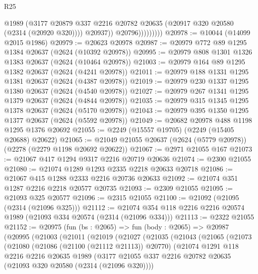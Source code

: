 \begin{lexlean}{R25}
\begin{coremodule}
                          @1989
                          (@3177
                            @20879
                            @337
                            @2216
                            @20782
                            @20635
                            (@20917 @320 @20580 (@2314 (@20920 @320))))
                          @20937))
                      @20796)))))))))
@20978 := @10044 (@14099 @2015 @1986)
@20979 := @20623 @20978
@20987 := @20979 @772 @89 @1295 @1384 @20637 (@2624 (@10392 @20978))
@20995 := @20979 @808 @1301 @1326 @1383 @20637 (@2624 (@10464 @20978))
@21003 := @20979 @164 @89 @1295 @1382 @20637 (@2624 (@4241 @20978))
@21011 := @20979 @188 @1331 @1295 @1381 @20637 (@2624 (@4387 @20978))
@21019 := @20979 @230 @1337 @1295 @1380 @20637 (@2624 (@4540 @20978))
@21027 := @20979 @267 @1341 @1295 @1379 @20637 (@2624 (@4844 @20978))
@21035 := @20979 @315 @1345 @1295 @1378 @20637 (@2624 (@5170 @20978))
@21043 := @20979 @395 @1350 @1295 @1377 @20637 (@2624 (@5592 @20978))
@21049 := @20682 @20978 @488 @1198 @1295 @1376 @20692
@21055 := @2249 (@15557 @19705) (@2249 (@15405 @20688) @20622)
@21065 := @21049 @21055 @20637 (@2624 (@5779 @20978)) (@2278 (@2279 @1198 @20692 @20622))
@21067 := @2971 @21055 @167
@21073 := @21067 @417 @1294 @9317 @2216 @20719 @20636
@21074 := @2300 @21055
@21080 := @21074 @1289 @1293 @2335 @2218 @20633 @20718
@21086 := @21067 @415 @1288 @2333 @2216 @20736 @20633
@21092 := @21074 @351 @1287 @2216 @2218 @20577 @20735
@21093 := @2309 @21055
@21095 := @21093 @325 @20577
@21096 := @2315 @21055
@21100 := @21092 (@21095 (@2314 (@21096 @325)))
@21112 := @21074 @354 @118 @2216 @2216 @20574 @1989 (@21093 @334 @20574 (@2314 (@21096 @334)))
@21113 := @2322 @21055
@21152 := @20975
    (fun (bs : @2065) =>
    fun (body : @2065) =>
    @20987
      (@20995
        (@21003
          (@21011
            (@21019
              (@21027
                (@21035
                  (@21043
                    (@21065
                      (@21073
                        (@21080
                          (@21086 (@21100 (@21112 @21113)) @20770)
                          (@21074
                            @1291
                            @118
                            @2216
                            @2216
                            @20635
                            @1989
                            (@3177
                              @21055
                              @337
                              @2216
                              @20782
                              @20635
                              (@21093 @320 @20580 (@2314 (@21096 @320))))

\end{coremodule}
\end{lexlean}
